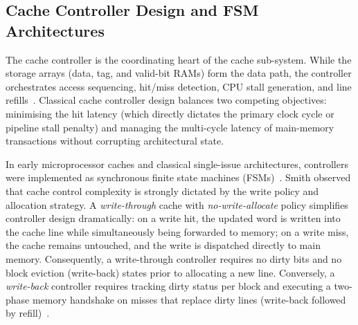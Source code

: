%


\subsection{Cache Controller Design and FSM Architectures}
\label{sec:litrev-m2}

The cache controller is the coordinating heart of the cache sub-system.
While the storage arrays (data, tag, and valid-bit RAMs) form the data
path, the controller orchestrates access sequencing, hit/miss detection,
CPU stall generation, and line refills~\cite{smith1982,hennessy2017}.
Classical cache controller design balances two competing objectives:
minimising the hit latency (which directly dictates the primary clock
cycle or pipeline stall penalty) and managing the multi-cycle latency of
main-memory transactions without corrupting architectural state.

In early microprocessor caches and classical single-issue architectures,
controllers were implemented as synchronous finite state machines
(FSMs)~\cite{smith1982}. Smith observed that cache control complexity
is strongly dictated by the write policy and allocation strategy.
A \emph{write-through} cache with \emph{no-write-allocate} policy
simplifies controller design dramatically: on a write hit, the updated
word is written into the cache line while simultaneously being forwarded
to memory; on a write miss, the cache remains untouched, and the write
is dispatched directly to main memory. Consequently, a write-through
controller requires no dirty bits and no block eviction (write-back)
states prior to allocating a new line. Conversely, a \emph{write-back}
controller requires tracking dirty status per block and executing a
two-phase memory handshake on misses that replace dirty lines (write-back
followed by refill)~\cite{hennessy2017}.

